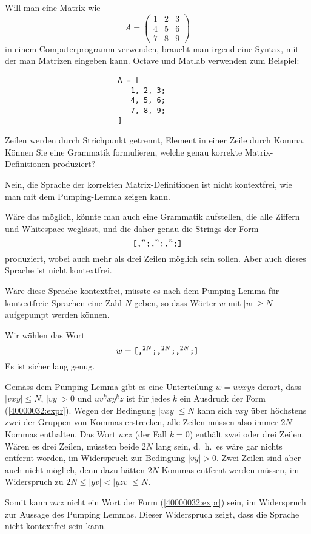 Will man eine Matrix wie
\[
A=\begin{pmatrix}
1&2&3\\
4&5&6\\
7&8&9
\end{pmatrix}
\]
in einem Computerprogramm verwenden, braucht man irgend eine Syntax,
mit der man Matrizen eingeben kann. Octave und Matlab verwenden zum
Beispiel:
\begin{verbatim}
                          A = [
                             1, 2, 3;
                             4, 5, 6;
                             7, 8, 9;
                          ]
\end{verbatim}
Zeilen werden durch Strichpunkt getrennt, Element in einer Zeile durch Komma.
Können Sie eine Grammatik formulieren, welche genau korrekte
Matrix-Definitionen produziert?

\begin{loesung}
Nein, die Sprache der korrekten Matrix-Definitionen ist nicht
kontextfrei, wie man mit dem Pumping-Lemma zeigen kann.

Wäre das möglich, könnte man auch eine Grammatik aufstellen, die
alle Ziffern und Whitespace weglässt, und die daher genau die Strings der Form 
\begin{equation}
\text{\tt [}
\text{\tt ,}^n
\text{\tt ;}
\text{\tt ,}^n
\text{\tt ;}
\text{\tt ,}^n
\text{\tt ;}
\text{\tt ]}
\label{40000032:expr}
\end{equation}
produziert, wobei auch mehr als drei Zeilen möglich
sein sollen. Aber auch dieses Sprache ist nicht kontextfrei. 

Wäre diese Sprache kontextfrei, müsste es nach dem Pumping Lemma
für kontextfreie Sprachen eine Zahl $N$ geben, so dass Wörter $w$
mit $|w|\ge N$ aufgepumpt werden können. 

Wir wählen das Wort
\[
w=
\text{\tt [}
\text{\tt ,}^{2N}
\text{\tt ;}
\text{\tt ,}^{2N}
\text{\tt ;}
\text{\tt ,}^{2N}
\text{\tt ;}
\text{\tt ]}
\]
Es ist sicher lang genug.

Gemäss dem Pumping Lemma gibt es eine Unterteilung $w=uvxyz$ derart,
dass $|vxy|\le N$, $|vy|>0$ und $uv^kxy^kz$ ist für jedes $k$
ein Ausdruck der Form
(\ref{40000032:expr}).
Wegen der Bedingung $|vxy|\le N$ kann sich $vxy$ über höchstens zwei
der Gruppen von Kommas erstrecken, alle Zeilen müssen
also immer $2N$ Kommas enthalten.
Das Wort $uxz$ (der Fall $k=0$) enthält zwei oder drei Zeilen.
Wären es drei Zeilen, müssten beide $2N$ lang sein, d.~h.~es
wäre gar nichts entfernt worden, im Widerspruch zur Bedingung
$|vy|>0$.
Zwei Zeilen sind aber auch nicht möglich, denn dazu
hätten $2N$ Kommas entfernt werden müssen, im Widerspruch
zu $2N\le |yv|<|yzv|\le N$.

Somit kann $uxz$ nicht ein Wort der Form
(\ref{40000032:expr})
sein, im Widerspruch zur Aussage des Pumping Lemmas.
Dieser Widerspruch zeigt, dass die Sprache nicht kontextfrei
sein kann.
\end{loesung}

